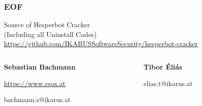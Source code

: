 \documentclass[12pt,a4paper]{beamer}
\begin{document}
\begin{frame}
\frametitle{EOF}

\centering
Source of Hesperbot Cracker\\
{\footnotesize (Including all Uninstall Codes)}
\small\url{https://github.com/IKARUSSoftwareSecurity/hesperbot-cracker}

\vspace{4em}

  \begin{columns}
    \begin{column}{.5\linewidth}
    \centering
	\textbf{Sebastian Bachmann}
	
	\vspace{1em}
	
	\url{https://www.reox.at}

	\vspace{1em}	
	
	bachmann.s@ikarus.at
    \end{column}
    \begin{column}{.5\linewidth}
    \centering
	\textbf{Tibor Éliás}
	
	\vspace{1em}
	
	\qquad

	\vspace{1em}	
	
	elias.t@ikarus.at
    \end{column}
  \end{columns}
\end{frame}
\end{document}

